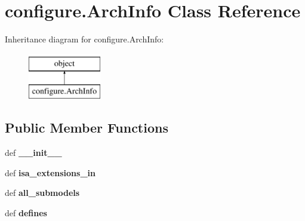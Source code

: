 \hypertarget{classconfigure_1_1ArchInfo}{\section{configure.\-Arch\-Info Class Reference}
\label{classconfigure_1_1ArchInfo}
}
Inheritance diagram for configure.\-Arch\-Info\-:\begin{figure}[H]
\begin{center}
\leavevmode
\includegraphics[height=2.000000cm]{classconfigure_1_1ArchInfo}
\end{center}
\end{figure}
\subsection*{Public Member Functions}
\begin{DoxyCompactItemize}
\item 
\hypertarget{classconfigure_1_1ArchInfo_ac17ed2cff0dcb10c88ca7f053a10b7ee}{def {\bfseries \-\_\-\-\_\-init\-\_\-\-\_\-}}\label{classconfigure_1_1ArchInfo_ac17ed2cff0dcb10c88ca7f053a10b7ee}

\item 
\hypertarget{classconfigure_1_1ArchInfo_ac2bd14b68090ff280db19ac1c609a57b}{def {\bfseries isa\-\_\-extensions\-\_\-in}}\label{classconfigure_1_1ArchInfo_ac2bd14b68090ff280db19ac1c609a57b}

\item 
\hypertarget{classconfigure_1_1ArchInfo_ade839f03ccfd77b3d2a6c7493b4a9f37}{def {\bfseries all\-\_\-submodels}}\label{classconfigure_1_1ArchInfo_ade839f03ccfd77b3d2a6c7493b4a9f37}

\item 
\hypertarget{classconfigure_1_1ArchInfo_a5b8ff6185a4e12730b0acae461d677d9}{def {\bfseries defines}}\label{classconfigure_1_1ArchInfo_a5b8ff6185a4e12730b0acae461d677d9}

\end{DoxyCompactItemize}
